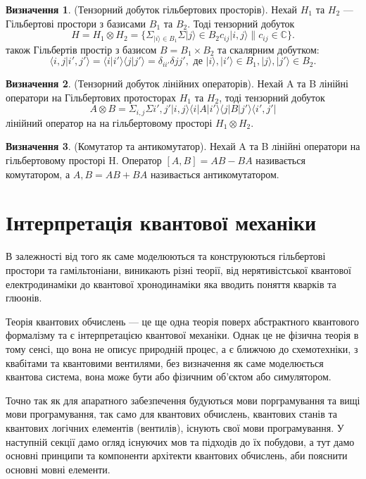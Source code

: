 \documentclass{article}
\theoremstyle{definition}
\newtheorem{definition}{Визначення}
\begin{document}
\begin{definition} (Тензорний добуток гільбертових просторів).
Нехай $H_1$ та $H_2$ --- Гільбертові простори з базисами $B_1$ та $B_2$.
Тоді тензорний добуток
$$
H = H_1 \otimes H_2 = \{ \Sigma_{|i\rangle \in B_1} \Sigma{|j\rangle \in B_2} c_{ij}|i,j\rangle \| c_{ij} \in \mathbb{C} \}.
$$
також Гільбертів простір з базисом $B = B_1 \times B_2$ та скалярним добутком:
$$
\langle i,j | i',j' \rangle = \langle i | i' \rangle \langle j | j' \rangle  = \delta_{ii'}\delta{jj'}, \text{\ де\ } |i\rangle,|i'\rangle \in B_1, |j\rangle,|j'\rangle \in B_2.
$$
\end{definition}

\begin{definition} (Тензорний добуток лінійних операторів).
Нехай A та B лінійні оператори на Гільбертових протосторах $H_1$ та $H_2$, тоді
тензорний добуток
$$
A \otimes B = \Sigma_{i,j}\Sigma{i',j'} |i,j\rangle\langle i|A|i'\rangle\langle j|B|j'\rangle\langle i',j'|
$$
лінійний оператор на на гільбертовому просторі $H_1\otimes H_2$.
\end{definition}

\begin{definition} (Комутатор та антикомутатор).
Нехай A та B лінійні оператори на гільбертовому просторі H.
Оператор $[A,B] = AB - BA$ називається комутатором,
а ${A,B} = AB + BA$ називається антикомутатором.
\end{definition}

\section{Інтерпретація квантової механіки}

В залежності від того як саме моделюються та конструюються
гільбертові простори та гамільтоніани, виникають різні теорії,
від нерятивістської квантової електродинаміки до квантової хронодинаміки яка
вводить поняття кварків та глюонів.

Теорія квантових обчислень --- це ще одна теорія поверх абстрактного квантового формалізму та
є інтерпретацією квантової механіки.
Однак це не фізична теорія в тому сенсі, що вона не описує природній процес,
а є ближчою до схемотехніки, з квабітами та квантовими вентилями, без визначення
як саме моделюється квантова система, вона може бути або фізичним об'єктом або симулятором.

Точно так як для апаратного забезпечення будуються мови порграмування та вищі мови програмування,
так само для квантових обчислень, квантових станів та квантових логічних елементів (вентилів),
існують свої мови програмування. У наступній секції дамо огляд існуючих мов та підходів до їх
побудови, а тут дамо основні принципи та компоненти архітекти квантових
обчислень, аби пояснити основні мовні елементи.
\end{document}
